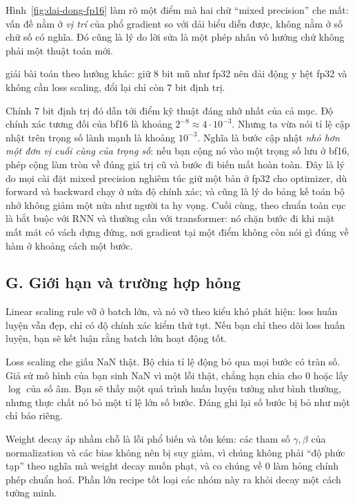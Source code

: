 \documentclass[../../../deep_learning.tex]{subfiles}
\begin{document}
Hình~\ref{fig:dai-dong-fp16} làm rõ một điểm mà hai chữ ``mixed precision'' che mất: vấn đề nằm ở \emph{vị trí} của phổ gradient so với dải biểu diễn được, không nằm ở số chữ số có nghĩa. Đó cũng là lý do lời sửa là một phép nhân vô hướng chứ không phải một thuật toán mới.

 giải bài toán theo hướng khác: giữ \(8\) bit mũ như fp32 nên dải động y hệt fp32 và không cần loss scaling, đổi lại chỉ còn \(7\) bit định trị.

Chính \(7\) bit định trị đó dẫn tới điểm kỹ thuật đáng nhớ nhất của cả mục. Độ chính xác tương đối của bf16 là khoảng \(2^{-8} \approx 4\cdot 10^{-3}\). Nhưng ta vừa nói tỉ lệ cập nhật trên trọng số lành mạnh là khoảng \(10^{-3}\). Nghĩa là bước cập nhật \emph{nhỏ hơn một đơn vị cuối cùng của trọng số}: nếu bạn cộng nó vào một trọng số lưu ở bf16, phép cộng làm tròn về đúng giá trị cũ và bước đi biến mất hoàn toàn. Đây là lý do mọi cài đặt mixed precision nghiêm túc giữ một bản  ở fp32 cho optimizer, dù forward và backward chạy ở nửa độ chính xác; và cũng là lý do bảng kế toán bộ nhớ không giảm một nửa như người ta hy vọng.
 Cuối cùng,  theo chuẩn toàn cục là bắt buộc với RNN và thường cần với transformer: nó chặn bước đi khi mặt mất mát có vách dựng đứng, nơi gradient tại một điểm không còn nói gì đúng về hàm ở khoảng cách một bước.

\subsection{G. Giới hạn và trường hợp hỏng}
Linear scaling rule vỡ ở batch lớn, và nó vỡ theo kiểu khó phát hiện: loss huấn luyện vẫn đẹp, chỉ có độ chính xác kiểm thử tụt. Nếu bạn chỉ theo dõi loss huấn luyện, bạn sẽ kết luận rằng batch lớn hoạt động tốt.

Loss scaling che giấu NaN thật. Bộ chia tỉ lệ động bỏ qua mọi bước có tràn số. Giả sử mô hình của bạn sinh NaN vì một lỗi thật, chẳng hạn chia cho \(0\) hoặc lấy \(\log\) của số âm. Bạn sẽ thấy một quá trình huấn luyện tưởng như bình thường, nhưng thực chất nó bỏ một tỉ lệ lớn số bước. Đáng ghi lại số bước bị bỏ như một chỉ báo riêng.

Weight decay áp nhầm chỗ là lỗi phổ biến và tốn kém: các tham số \(\gamma, \beta\) của normalization và các bias không nên bị suy giảm, vì chúng không phải ``độ phức tạp'' theo nghĩa mà weight decay muốn phạt, và co chúng về \(0\) làm hỏng chính phép chuẩn hoá. Phần lớn recipe tốt loại các nhóm này ra khỏi decay một cách tường minh.
\end{document}
